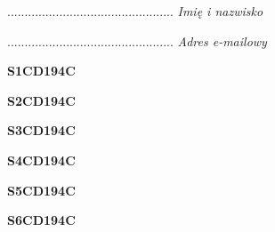 \begin{turn}{90}\begin{minipage}{\linewidth} \vspace{20mm} ................................................  \textit{Imię i nazwisko}\end{minipage}\end{turn}

\begin{turn}{90}\begin{minipage}{\linewidth} \vspace{20mm} ................................................  \textit{Adres e-mailowy}\end{minipage}\end{turn}

\begin{turn}{90}\huge \begin{minipage}{\linewidth} \vspace{10mm}\textbf{S1CD194C}\end{minipage}\end{turn}

\begin{turn}{90}\huge \begin{minipage}{\linewidth} \vspace{10mm}\textbf{S2CD194C}\end{minipage}\end{turn}

\begin{turn}{90}\huge \begin{minipage}{\linewidth} \vspace{10mm}\textbf{S3CD194C}\end{minipage}\end{turn}

\begin{turn}{90}\huge \begin{minipage}{\linewidth} \vspace{10mm}\textbf{S4CD194C}\end{minipage}\end{turn}

\begin{turn}{90}\huge \begin{minipage}{\linewidth} \vspace{10mm}\textbf{S5CD194C}\end{minipage}\end{turn}

\begin{turn}{90}\huge \begin{minipage}{\linewidth} \vspace{10mm}\textbf{S6CD194C}\end{minipage}\end{turn}

